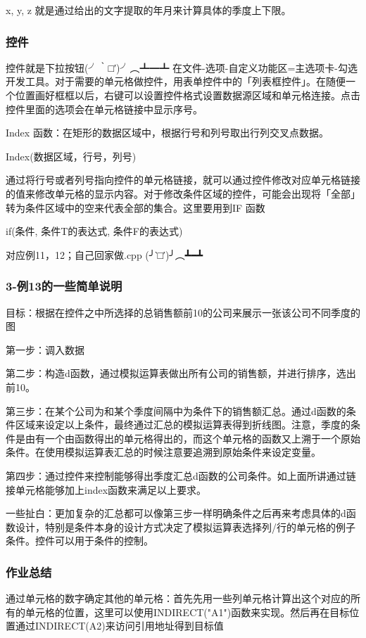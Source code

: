 \documentclass[10pt, a4paper]{article}
\begin{document}
                x, y, z 就是通过给出的文字提取的年月来计算具体的季度上下限。

            \subsubsection{控件}
            控件就是下拉按钮(╯‵□′)╯︵┻━┻ 在文件-选项-自定义功能区=主选项卡-勾选开发工具。对于需要的单元格做控件，用表单控件中的「列表框控件」。在随便一个位置画好框框以后，右键可以设置控件格式设置数据源区域和单元格连接。点击控件里面的选项会在单元格链接中显示序号。 
                
            Index 函数：在矩形的数据区域中，根据行号和列号取出行列交叉点数据。
            \begin{center}
                Index(数据区域，行号，列号)
            \end{center}

            通过将行号或者列号指向控件的单元格链接，就可以通过控件修改对应单元格链接的值来修改单元格的显示内容。对于修改条件区域的控件，可能会出现将「全部」转为条件区域中的空来代表全部的集合。这里要用到IF 函数

            \begin{center}
                if(条件, 条件T的表达式, 条件F的表达式)
            \end{center}

            对应例11，12；自己回家做.cpp (╯‵□′)╯︵┻━┻ 

            \subsubsection{3-例13的一些简单说明}
                目标：根据在控件之中所选择的总销售额前10的公司来展示一张该公司不同季度的图

                第一步：调入数据
                
                第二步：构造d函数，通过模拟运算表做出所有公司的销售额，并进行排序，选出前10。
                
                第三步：在某个公司为和某个季度间隔中为条件下的销售额汇总。通过d函数的条件区域来设定以上条件，最终通过汇总的模拟运算表得到折线图。注意，季度的条件是由有一个由函数得出的单元格得出的，而这个单元格的函数又上溯于一个原始条件。在使用模拟运算表汇总的时候注意要追溯到原始条件来设定变量。
                
                第四步：通过控件来控制能够得出季度汇总d函数的公司条件。如上面所讲通过链接单元格能够加上index函数来满足以上要求。

                一些扯白：更加复杂的汇总都可以像第三步一样明确条件之后再来考虑具体的d函数设计，特别是条件本身的设计方式决定了模拟运算表选择列/行的单元格的例子条件。控件可以用于条件的控制。
            \subsubsection{作业总结}
                通过单元格的数字确定其他的单元格：首先先用一些列单元格计算出这个对应的所有的单元格的位置，这里可以使用INDIRECT("A1")函数来实现。然后再在目标位置通过INDIRECT(A2)来访问引用地址得到目标值
\end{document}
